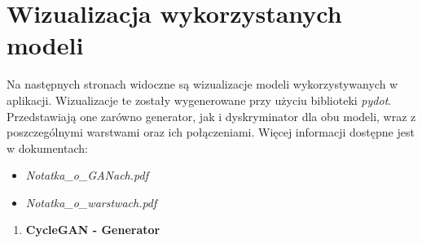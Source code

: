 \documentclass{article}
\begin{document}
\section{Wizualizacja wykorzystanych modeli}
Na następnych stronach widoczne są wizualizacje modeli wykorzystywanych w aplikacji. Wizualizacje te zostały wygenerowane przy użyciu biblioteki \textit{pydot}. Przedstawiają one zarówno generator, jak i dyskryminator dla obu modeli, wraz z poszczególnymi warstwami oraz ich połączeniami. Więcej informacji dostępne jest w dokumentach:
\begin{itemize}
    \setlength\itemsep{0pt}
    \item \textit{Notatka\_o\_GANach.pdf}
    \item \textit{Notatka\_o\_warstwach.pdf}
\end{itemize}
\newpage
\begin{enumerate}[label=\arabic*.]
    \item \textbf{CycleGAN - Generator}
        \vspace{3mm} \\

\end{enumerate}
\end{document}
